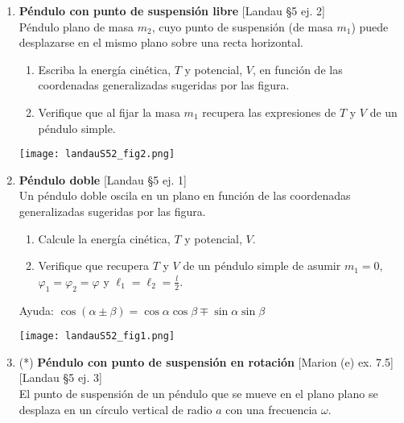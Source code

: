 \documentclass[11pt, spanish, a4paper, twoside]{article}
\begin{document}
\begin{enumerate}
\item \begin{minipage}[t][4cm]{0.7\textwidth}
\textbf{Péndulo con punto de suspensión libre} [Landau \S5 ej. 2]\\
Péndulo plano de masa \(m_2\), cuyo punto de suspensión (de masa \(m_1\)) puede desplazarse en el mismo plano sobre una recta horizontal.
\begin{enumerate}
	\item Escriba la energía cinética, \(T\) y potencial, \(V\), en función de las coordenadas generalizadas sugeridas por las figura.
	\item Verifique que al fijar la masa \(m_1\) recupera las expresiones de \(T\) y \(V\) de un péndulo simple.
\end{enumerate}
\end{minipage}
\begin{minipage}[c][1cm][t]{0.3\textwidth}
        \texttt{[image: landauS52\_fig2.png]}
\end{minipage}



\item \begin{minipage}[t][4cm]{0.7\textwidth}
\textbf{Péndulo doble} [Landau \S5 ej. 1]\\
Un péndulo doble oscila en un plano en función de las coordenadas generalizadas sugeridas por las figura.
\begin{enumerate}
	\item Calcule la energía cinética, \(T\) y potencial, \(V\).
	\item Verifique que recupera \(T\) y \(V\) de un péndulo simple de asumir \(m_1=0\), \(\varphi_1 = \varphi_2 = \varphi\) y \(\ell_1 = \ell_2 = \frac{l}{2}\).
\end{enumerate}
Ayuda: \( \cos(\alpha \pm \beta) = \cos{ \alpha} \cos{ \beta \mp \sin \alpha} \sin{ \beta } \)
\end{minipage}
\begin{minipage}[c][0.5cm][t]{0.3\textwidth}
	\texttt{[image: landauS52\_fig1.png]}
\end{minipage}



\item \begin{minipage}[t][7cm]{0.5\textwidth}
(*) \textbf{Péndulo con punto de suspensión en rotación} [Marion (e) ex. 7.5] [Landau \S5 ej. 3]\\
El punto de suspensión de un péndulo que se mueve en el plano plano se desplaza en un círculo vertical de radio \(a\) con una frecuencia \(\omega\).


\end{minipage}
\end{enumerate}
\end{document}
